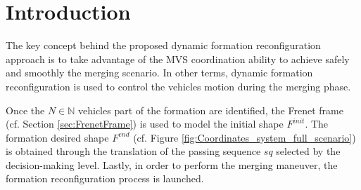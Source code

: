 





  






\section{Introduction}




The key concept behind the proposed dynamic formation reconfiguration approach is to take advantage of the MVS coordination ability to achieve safely and smoothly the merging scenario. In other terms, dynamic formation reconfiguration is used to control the vehicles motion during the merging phase. 

Once the ${N}\in \mathbb {N}$ vehicles part of the formation are identified, the Frenet frame (cf. Section \ref{sec:FrenetFrame}) is used to model the initial shape $F^{init}$. The formation desired shape $F^{end}$ (cf. Figure \ref{fig:Coordinates_system_full_scenario}) is obtained through the translation of the passing sequence $sq$ selected by the decision-making level. Lastly, in order to perform the merging maneuver, the formation reconfiguration process is launched. 

